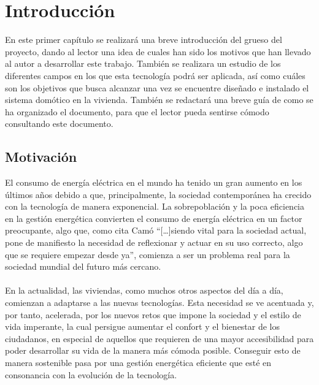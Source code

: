 \chapter{Introducción}

En este primer capítulo se realizará una breve introducción del grueso del proyecto, dando al lector una idea de cuales han sido los motivos que han llevado al autor a desarrollar este trabajo. También se realizara un estudio de los diferentes campos en los que esta tecnología podrá ser aplicada, así como cuáles son los objetivos que busca alcanzar una vez se encuentre diseñado e instalado el sistema domótico en la vivienda. También se redactará una breve guía de como se ha organizado el documento, para que el lector pueda sentirse cómodo consultando este documento.

\section{Motivación}

El consumo de energía eléctrica en el mundo ha tenido un gran aumento en los últimos años debido a que, principalmente, la sociedad contemporánea ha crecido con la tecnología de manera exponencial. La sobrepoblación y la poca eficiencia en la gestión energética convierten el consumo de energía eléctrica en un factor preocupante, algo que, como cita Camó \cite{Camo:2015} “[…]siendo vital para la sociedad actual, pone de manifiesto la necesidad de reflexionar y actuar en su uso correcto, algo que se requiere empezar desde ya”, comienza a ser un problema real para la sociedad mundial del futuro más cercano.\\\\

En la actualidad, las viviendas, como muchos otros aspectos del día a día, comienzan a adaptarse a las nuevas tecnologías. Esta necesidad se ve acentuada y, por tanto, acelerada, por los nuevos retos que impone la sociedad y el estilo de vida imperante, la cual persigue aumentar el confort y el bienestar de los ciudadanos, en especial de aquellos que requieren de una mayor accesibilidad para poder desarrollar su vida de la manera más cómoda posible. Conseguir esto de manera sostenible pasa por una gestión energética eficiente que esté en consonancia con la evolución de la tecnología. \\\\

